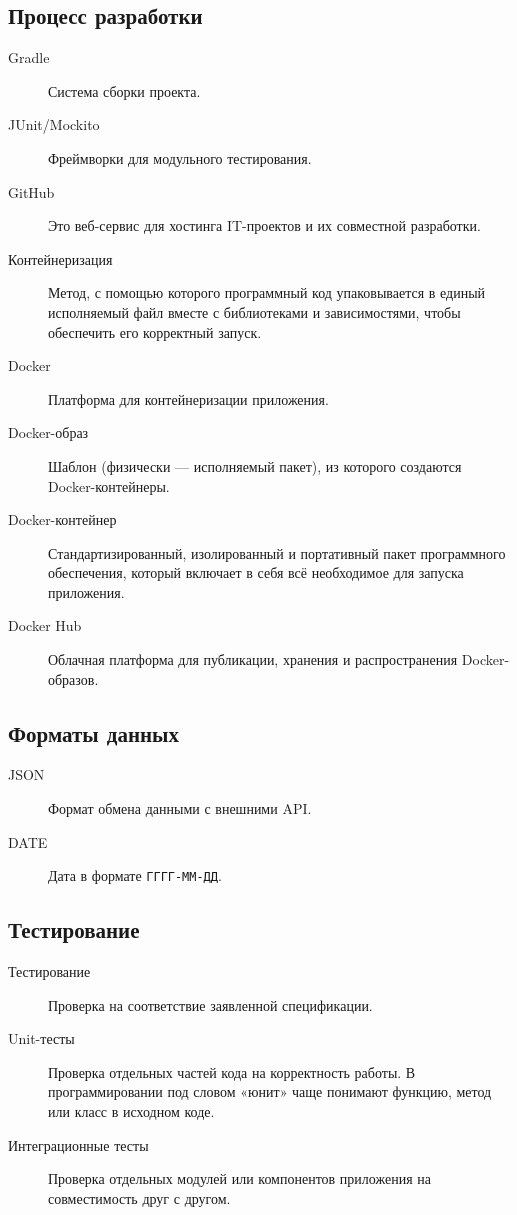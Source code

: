 \documentclass[areasetadvanced]{scrartcl}
\begin{document}
\subsection{Процесс разработки}
\begin{description}
\item[Gradle] Система сборки проекта.
\item[JUnit/Mockito] Фреймворки для модульного тестирования.
\item[GitHub] Это веб-сервис для хостинга IT-проектов и их совместной
  разработки.
\item[Контейнеризация] Метод, с помощью которого программный код
  упаковывается в единый исполняемый файл вместе с библиотеками и
  зависимостями, чтобы обеспечить его корректный запуск.
\item[Docker] Платформа для контейнеризации приложения.
\item[Docker-образ] Шаблон (физически --- исполняемый пакет), из
  которого создаются Docker-контейнеры.
\item[Docker-контейнер] Стандартизированный, изолированный и
  портативный пакет программного обеспечения, который включает в себя
  всё необходимое для запуска приложения.
\item[Docker Hub] Облачная платформа для публикации, хранения и
  распространения Docker-образов.
\end{description}

\subsection{Форматы данных}
\begin{description}
\item[JSON] Формат обмена данными с внешними API.
\item[DATE] Дата в формате \texttt{ГГГГ-ММ-ДД}.
\end{description}

\subsection{Тестирование}
\begin{description}
\item[Тестирование] Проверка на соответствие заявленной спецификации.
\item[Unit-тесты] Проверка отдельных частей кода на корректность
  работы. В программировании под словом «юнит» чаще понимают функцию,
  метод или класс в исходном коде.
\item[Интеграционные тесты] Проверка отдельных модулей или компонентов
  приложения на совместимость друг с другом.
\end{description}
\newpage
\end{document}
